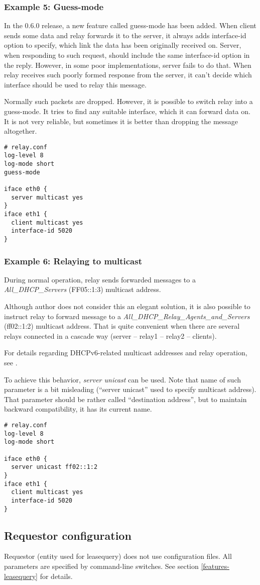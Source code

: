 \subsubsection{Example 5: Guess-mode}
In the 0.6.0 release, a new feature called guess-mode has been
added. When client sends some data and relay forwards it to the
server, it always adds interface-id option to specify, which link
the data has been originally received on. Server, when responding to
such request, should include the same interface-id option in the
reply. However, in some poor implementations, server fails to do
that. When relay receives such poorly formed response from the server,
it can't decide which interface should be used to relay this
message. 

Normally such packets are dropped. However, it is possible to switch
relay into a guess-mode. It tries to find any suitable interface,
which it can forward data on. It is not very reliable, but sometimes
it is better than dropping the message altogether.

\begin{lstlisting}
# relay.conf
log-level 8
log-mode short
guess-mode

iface eth0 {
  server multicast yes
}
iface eth1 {
  client multicast yes
  interface-id 5020
}
\end{lstlisting}

\subsubsection{Example 6: Relaying to multicast}
During normal operation, relay sends forwarded messages to a 
\emph{All\_DHCP\_Servers} (FF05::1:3) multicast address.

Although author does not consider this an elegant solution, it is also 
possible to instruct relay to forward message to a \emph{All\_DHCP\_Relay\_Agents\_and\_Servers}
(ff02::1:2) multicast address. That is quite convenient when there are several 
relays connected in a cascade way (server -- relay1 -- relay2 -- clients).

For details regarding DHCPv6-related multicast addresses and relay operation, see \cite{rfc3315}.

To achieve this behavior, \emph{server unicast} can be used. Note that
name of such parameter is a bit misleading (``server unicast'' used to specify
multicast address). That parameter should be rather called ``destination address'', 
but to maintain backward compatibility, it has its current name.

\begin{lstlisting}
# relay.conf
log-level 8
log-mode short

iface eth0 {
  server unicast ff02::1:2
}
iface eth1 {
  client multicast yes
  interface-id 5020
}
\end{lstlisting}

\subsection{Requestor configuration}
Requestor (entity used for leasequery) does not use configuration
files. All parameters are specified by command-line switches. See
section \ref{features-leasequery} for details.
